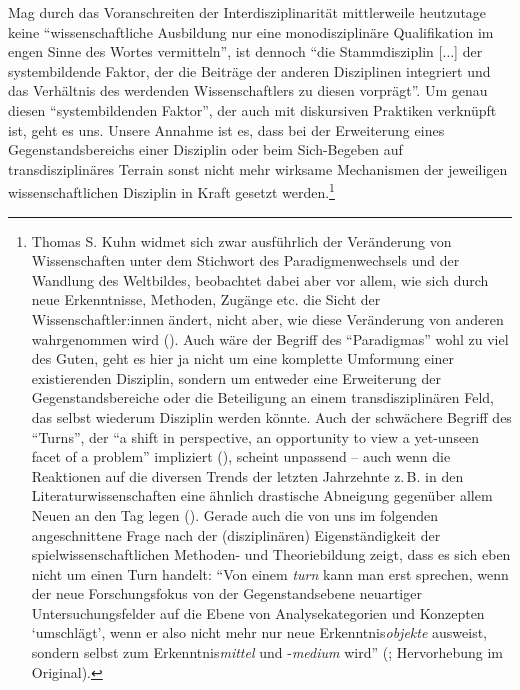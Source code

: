 \documentclass{scrartcl}
\begin{document}
Mag durch das Voranschreiten der Interdisziplinarität mittlerweile heutzutage keine \enquote{wissenschaftliche Ausbildung nur eine monodisziplinäre Qualifikation im engen Sinne des Wortes vermitteln}, ist dennoch \enquote{die Stammdisziplin [$\ldots$] der systembildende Faktor, der die Beiträge der anderen Disziplinen integriert und das Verhältnis des werdenden Wissenschaftlers zu diesen vorprägt}.\autocite[][S.~13]{guntau_einleitung_2021}
Um genau diesen \enquote{systembildenden Faktor}, der auch mit diskursiven Praktiken verknüpft ist, geht es uns.
Unsere Annahme ist es, dass bei der Erweiterung eines Gegenstandsbereichs einer Disziplin oder beim Sich-Begeben auf transdisziplinäres Terrain sonst nicht mehr wirksame Mechanismen der jeweiligen wissenschaftlichen Disziplin in Kraft gesetzt werden.\footnote{Thomas S. Kuhn widmet sich zwar ausführlich der Veränderung von Wissenschaften unter dem Stichwort des Paradigmenwechsels und der Wandlung des Weltbildes, beobachtet dabei aber vor allem, wie sich durch neue Erkenntnisse, Methoden, Zugänge etc. die Sicht der Wissenschaftler:innen ändert, nicht aber, wie diese Veränderung von anderen wahrgenommen wird (\autocite[vgl.][]{kuhn_struktur_1997}). Auch wäre der Begriff des \enquote{Paradigmas} wohl zu viel des Guten, geht es hier ja nicht um eine komplette Umformung einer existierenden Disziplin, sondern um entweder eine Erweiterung der Gegenstandsbereiche oder die Beteiligung an einem transdisziplinären Feld, das selbst wiederum Disziplin werden könnte. Auch der schwächere Begriff des \enquote{Turns}, der \enquote{a shift in perspective, an opportunity to view a yet-unseen facet of a problem} impliziert (\autocite[][S.~7]{meierhofer_turns_2011}), scheint unpassend -- auch wenn die Reaktionen auf die diversen Trends der letzten Jahrzehnte z.\,B. in den Literaturwissenschaften eine ähnlich drastische Abneigung gegenüber allem Neuen an den Tag legen (\autocite[vgl. auch][S.~9--22]{sturm-trigonakis_turns_2017}). Gerade auch die von uns im folgenden angeschnittene Frage nach der (disziplinären) Eigenständigkeit der spielwissenschaftlichen Methoden- und Theoriebildung zeigt, dass es sich eben nicht um einen Turn handelt: \enquote{Von einem \textit{turn} kann man erst sprechen, wenn der neue Forschungsfokus von der Gegenstandsebene neuartiger Untersuchungsfelder auf die Ebene von Analysekategorien und Konzepten \enquote{umschlägt}, wenn er also nicht mehr nur neue Erkenntnis\textit{objekte} ausweist, sondern selbst zum Erkenntnis\textit{mittel} und -\textit{medium} wird} (\autocite[][S.~26]{bachmann-medick_cultural_2006}; Hervorhebung im Original).}
\end{document}
